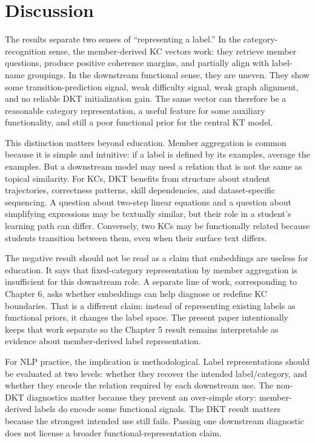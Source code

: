 \section{Discussion}
The results separate two senses of ``representing a label.'' In the category-recognition sense, the member-derived KC vectors work: they retrieve member questions, produce positive coherence margins, and partially align with label-name groupings. In the downstream functional sense, they are uneven. They show some transition-prediction signal, weak difficulty signal, weak graph alignment, and no reliable DKT initialization gain. The same vector can therefore be a reasonable category representation, a useful feature for some auxiliary functionality, and still a poor functional prior for the central KT model.

This distinction matters beyond education. Member aggregation is common because it is simple and intuitive: if a label is defined by its examples, average the examples. But a downstream model may need a relation that is not the same as topical similarity. For KCs, DKT benefits from structure about student trajectories, correctness patterns, skill dependencies, and dataset-specific sequencing. A question about two-step linear equations and a question about simplifying expressions may be textually similar, but their role in a student's learning path can differ. Conversely, two KCs may be functionally related because students transition between them, even when their surface text differs.

The negative result should not be read as a claim that embeddings are useless for education. It says that fixed-category representation by member aggregation is insufficient for this downstream role. A separate line of work, corresponding to Chapter 6, asks whether embeddings can help diagnose or redefine KC boundaries. That is a different claim: instead of representing existing labels as functional priors, it changes the label space. The present paper intentionally keeps that work separate so the Chapter 5 result remains interpretable as evidence about member-derived label representation.

For NLP practice, the implication is methodological. Label representations should be evaluated at two levels: whether they recover the intended label/category, and whether they encode the relation required by each downstream use. The non-DKT diagnostics matter because they prevent an over-simple story: member-derived labels do encode some functional signals. The DKT result matters because the strongest intended use still fails. Passing one downstream diagnostic does not license a broader functional-representation claim.

